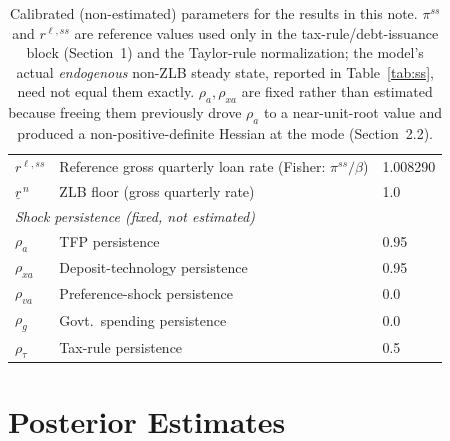 \documentclass[11pt]{article}
\begin{document}
\begin{table}[htbp]
\begin{tabular}{lll}
$r^{\ell,ss}$& Reference gross quarterly loan rate (Fisher: $\pi^{ss}/\beta$) & 1.008290 \\
$\underline{r}^{\,n}$ & ZLB floor (gross quarterly rate) & 1.0 \\
\midrule
\multicolumn{3}{l}{\textit{Shock persistence (fixed, not estimated)}} \\
$\rho_a$     & TFP persistence                          & 0.95 \\
$\rho_{xa}$  & Deposit-technology persistence            & 0.95 \\
$\rho_{va}$  & Preference-shock persistence              & 0.0 \\
$\rho_g$     & Govt.\ spending persistence                & 0.0 \\
$\rho_\tau$  & Tax-rule persistence                     & 0.5 \\
\bottomrule
\end{tabular}
\caption{Calibrated (non-estimated) parameters for the results in this
note. $\pi^{ss}$ and $r^{\ell,ss}$ are reference values used only in
the tax-rule/debt-issuance block (Section~1) and the Taylor-rule
normalization; the model's actual \emph{endogenous} non-ZLB steady
state, reported in Table~\ref{tab:ss}, need not equal them exactly.
$\rho_a,\rho_{xa}$ are fixed rather than estimated because freeing them
previously drove $\rho_a$ to a near-unit-root value and produced a
non-positive-definite Hessian at the mode (Section~2.2).}
\label{tab:calib}
\end{table}

\section{Posterior Estimates}
\end{document}
